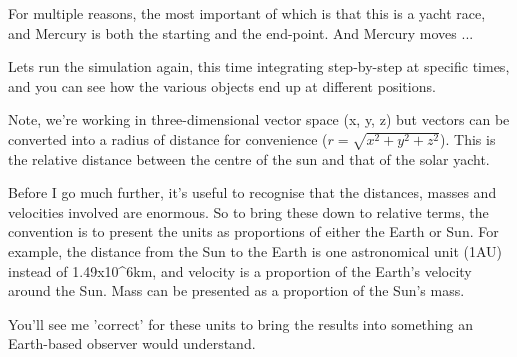 \documentclass[11pt]{article}
\begin{document}
For multiple reasons, the most important of which is that this is a
yacht race, and Mercury is both the starting and the end-point. And
Mercury moves ...

Lets run the simulation again, this time integrating step-by-step at
specific times, and you can see how the various objects end up at
different positions.

Note, we're working in three-dimensional vector space (x, y, z) but
vectors can be converted into a radius of distance for convenience
(\(r = \sqrt{x^2 + y^2 + z^2}\)). This is the relative distance between
the centre of the sun and that of the solar yacht.

Before I go much further, it's useful to recognise that the distances,
masses and velocities involved are enormous. So to bring these down to
relative terms, the convention is to present the units as proportions of
either the Earth or Sun. For example, the distance from the Sun to the
Earth is one astronomical unit (1AU) instead of 1.49x10\^{}6km, and
velocity is a proportion of the Earth's velocity around the Sun. Mass
can be presented as a proportion of the Sun's mass.

You'll see me 'correct' for these units to bring the results into
something an Earth-based observer would understand.
\end{document}
